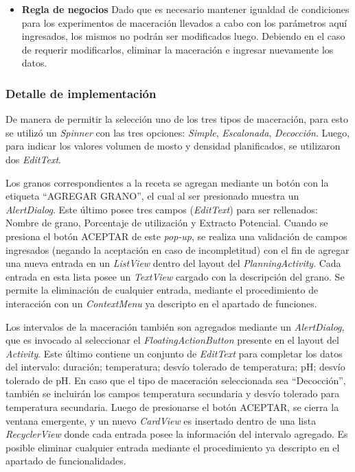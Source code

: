 \begin{itemize}
                    \item \textbf{Regla de negocios} Dado que es necesario mantener igualdad de condiciones para los experimentos de maceración llevados a cabo con los parámetros aquí ingresados, los mismos no podrán ser modificados luego. Debiendo en el caso de requerir modificarlos, eliminar la maceración e ingresar nuevamente los datos.
                \end{itemize}
            
            \subsubsection{Detalle de implementación}
                \par De manera de permitir la selección uno de los tres tipos de maceración, para esto se utilizó un \textit{Spinner} con las tres opciones: \textit{Simple}, \textit{Escalonada}, \textit{Decocción}. Luego, para indicar los valores volumen de mosto y densidad planificados, se utilizaron dos \textit{EditText}. %
                
                \par Los granos correspondientes a la receta se agregan mediante un botón con la etiqueta ``AGREGAR GRANO'', el cual al ser presionado muestra un \textit{AlertDialog}. Este último posee tres campos (\textit{EditText}) para ser rellenados: Nombre de grano, Porcentaje de utilización y Extracto Potencial. Cuando se presiona el botón ACEPTAR de este \textit{pop-up}, se realiza una validación de campos ingresados (negando la aceptación en caso de incompletitud) con el fin de agregar una nueva entrada en un \textit{ListView} dentro del layout del \textit{PlanningActivity}. Cada entrada en esta lista posee un \textit{TextView} cargado con la descripción del grano. Se permite la eliminación de cualquier entrada, mediante el procedimiento de interacción con un \textit{ContextMenu} ya descripto en el apartado de funciones.
                
                \par Los intervalos de la maceración también son agregados mediante un \textit{AlertDialog}, que es invocado al seleccionar el \textit{FloatingActionButton} presente en el layout del \textit{Activity}. Este último contiene un conjunto de \textit{EditText} para completar los datos del intervalo: duración; temperatura; desvío tolerado de temperatura; pH; desvío tolerado de pH. En caso que el tipo de maceración seleccionada sea ``Decocción'', también se incluirán los campos temperatura secundaria y desvío tolerado para temperatura secundaria. Luego de presionarse el botón ACEPTAR, se cierra la ventana emergente, y un nuevo \textit{CardView} es insertado dentro de una lista \textit{RecyclerView} donde cada entrada posee la información del intervalo agregado. Es posible eliminar cualquier entrada mediante el procedimiento ya descripto en el apartado de funcionalidades.
                
